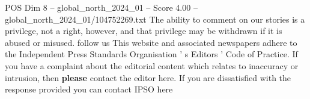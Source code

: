 \begin{textsample}{POS Dim 8 – global\_north\_2024\_01 – Score 4.00 – global\_north\_2024\_01/104752269.txt}
The ability to comment on our stories is a privilege, not a right, however, and that privilege may be withdrawn if it is abused or misused. follow us This website and associated newspapers adhere to the Independent Press Standards Organisation ' s Editors ' Code of Practice.
If you have a complaint about the editorial content which relates to inaccuracy or intrusion, then \textbf{please} contact the editor here.
If you are dissatisfied with the response provided you can contact IPSO here

\end{textsample}
